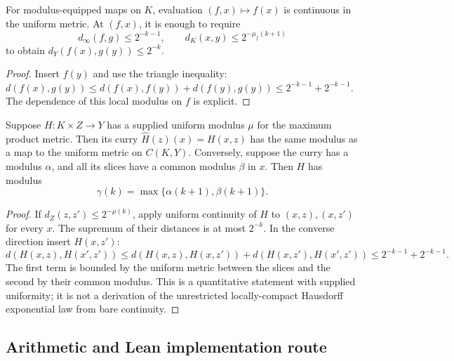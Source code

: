 \begin{proposition}
\label{prop:metric-evaluation}
For modulus-equipped maps on $K$, evaluation $(f,x)\mapsto f(x)$ is
continuous in the uniform metric.  At $(f,x)$, it is enough to require
\[
 d_\infty(f,g)\leq2^{-k-1},\qquad
 d_K(x,y)\leq2^{-\mu_f(k+1)}
\]
to obtain $d_Y(f(x),g(y))\leq2^{-k}$.
\end{proposition}
\begin{proof}
Insert $f(y)$ and use the triangle inequality:
$d(f(x),g(y))\leq d(f(x),f(y))+d(f(y),g(y))
\leq2^{-k-1}+2^{-k-1}$.
The dependence of this local modulus on $f$ is explicit.
\end{proof}

\begin{theorem}
\label{thm:metric-currying}
Suppose $H:K\times Z\to Y$ has a supplied uniform modulus $\mu$ for
the maximum product metric.  Then its curry
$\widehat H(z)(x)=H(x,z)$ has the same modulus as a map to the uniform
metric on $C(K,Y)$.  Conversely, suppose the curry has a modulus
$\alpha$, and all its slices have a common modulus $\beta$ in $x$.
Then $H$ has modulus
\[
 \gamma(k)=\max\{\alpha(k+1),\beta(k+1)\}.
\]
\end{theorem}
\begin{proof}
If $d_Z(z,z')\leq2^{-\mu(k)}$, apply uniform continuity of $H$ to
$(x,z),(x,z')$ for every $x$.  The supremum of their distances is at most
$2^{-k}$.  In the converse direction insert $H(x,z')$:
\[
 d(H(x,z),H(x',z'))
 \leq d(H(x,z),H(x,z'))+d(H(x,z'),H(x',z'))
 \leq2^{-k-1}+2^{-k-1}.
\]
The first term is bounded by the uniform metric between the slices and
the second by their common modulus.  This is a quantitative statement
with supplied uniformity; it is not a derivation of the unrestricted
locally-compact Hausdorff exponential law from bare continuity.
\end{proof}

\subsection{Arithmetic and Lean implementation route}

